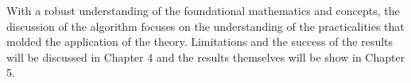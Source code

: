 %
%
%
%
%
%

%
%
%



With a robust understanding of the foundational mathematics and concepts, the discussion of the algorithm focuses on the understanding of the practicalities that molded the application of the theory. Limitations and the success of the results will be discussed in Chapter 4 and the results themselves will be show in Chapter 5.



